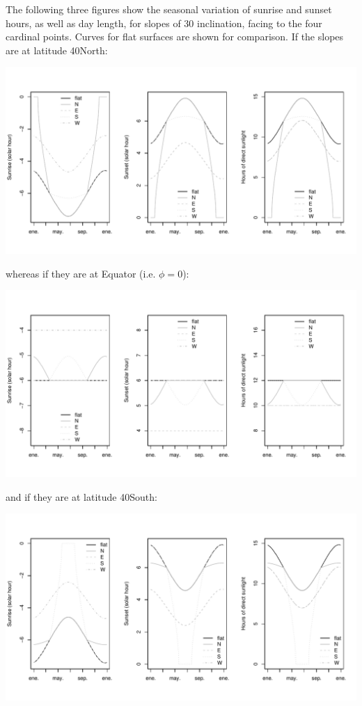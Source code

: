 \documentclass[11pt,a4paper]{article}
\begin{document}
The following three figures show the seasonal variation of sunrise and sunset hours, as well as day length, for slopes of 30 inclination, facing to the four cardinal points. Curves for flat surfaces are shown for comparison. If the slopes are at latitude 40North:
\begin{center}
\includegraphics{Meteorology-012}
\end{center}
whereas if they are at Equator (i.e. $\phi = 0$):
\begin{center}
\includegraphics{Meteorology-013}
\end{center}
and if they are at latitude 40South:
\begin{center}
\includegraphics{Meteorology-014}
\end{center}
\end{document}
